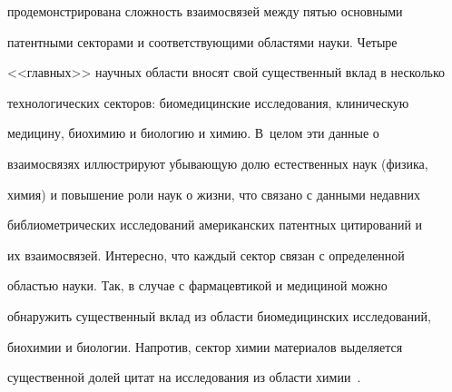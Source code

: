 продемонстрирована сложность взаимосвязей между пятью основными 


патентными секторами и соответствующими областями науки. Четыре 


<<главных>> научных области вносят свой существенный вклад в несколько 


технологических секторов: биомедицинские исследования, клиническую 


медицину, биохимию и биологию и химию. В~целом эти данные о 


взаимосвязях иллюстрируют убывающую долю естественных наук (физика, 


химия) и повышение роли наук о жизни, что связано с данными недавних 


библиометрических исследований американских патентных цитирований и 


их взаимосвязей. Интересно, что каждый сектор связан с определенной 


областью науки. Так, в случае с фармацевтикой и медициной можно 


обнаружить существенный вклад из области биомедицинских исследований, 


биохимии и биологии. Напротив, сектор химии материалов выделяется 


существенной долей цитат на исследования из области химии~\cite{1-koz}.





